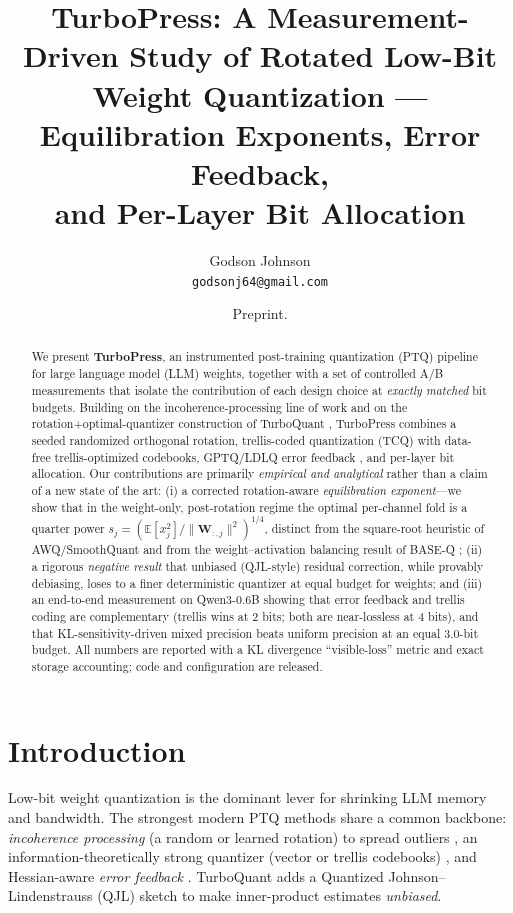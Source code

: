 \documentclass[11pt]{article}
\title{\textbf{TurboPress}: A Measurement-Driven Study of Rotated Low-Bit\\
Weight Quantization --- Equilibration Exponents, Error Feedback,\\
and Per-Layer Bit Allocation}
\author{Godson Johnson\\ \texttt{godsonj64@gmail.com}}
\date{Preprint.}
\newcommand{\E}{\mathbb{E}}
\newcommand{\W}{\mathbf{W}}
\begin{document}
\maketitle

\begin{abstract}
We present \textbf{TurboPress}, an instrumented post-training quantization (PTQ)
pipeline for large language model (LLM) weights, together with a set of
controlled A/B measurements that isolate the contribution of each design choice
at \emph{exactly matched} bit budgets. Building on the incoherence-processing
line of work \citep{chee2023quip,tseng2024quipsharp,tseng2024qtip,ashkboos2024quarot}
and on the rotation+optimal-quantizer construction of TurboQuant
\citep{zandieh2025turboquant}, TurboPress combines a seeded randomized
orthogonal rotation, trellis-coded quantization (TCQ) with data-free
trellis-optimized codebooks, GPTQ/LDLQ error feedback
\citep{frantar2023gptq,chee2023quip}, and per-layer bit allocation. Our
contributions are primarily \emph{empirical and analytical} rather than a claim
of a new state of the art: (i) a corrected rotation-aware \emph{equilibration
exponent}---we show that in the weight-only, post-rotation regime the optimal
per-channel fold is a quarter power $s_j=(\E[x_j^2]/\lVert \W_{:,j}\rVert^2)^{1/4}$,
distinct from the square-root heuristic of AWQ/SmoothQuant
\citep{lin2024awq,xiao2023smoothquant} and from the weight--activation balancing
result of BASE-Q \citep{he2025baseq}; (ii) a rigorous \emph{negative result} that
unbiased (QJL-style) residual correction, while provably debiasing, loses to a
finer deterministic quantizer at equal budget for weights; and (iii) an
end-to-end measurement on Qwen3-0.6B showing that error feedback and trellis
coding are complementary (trellis wins at 2 bits; both are near-lossless at 4
bits), and that KL-sensitivity-driven mixed precision beats uniform precision at
an equal $3.0$-bit budget. All numbers are reported with a KL divergence
``visible-loss'' metric and exact storage accounting; code and configuration are
released.
\end{abstract}

\section{Introduction}
Low-bit weight quantization is the dominant lever for shrinking LLM memory and
bandwidth. The strongest modern PTQ methods share a common backbone:
\emph{incoherence processing} (a random or learned rotation) to spread outliers
\citep{chee2023quip,ashkboos2024quarot,liu2024spinquant}, an
information-theoretically strong quantizer (vector or trellis codebooks)
\citep{tseng2024quipsharp,tseng2024qtip,vanderouderaa2024pvq}, and Hessian-aware
\emph{error feedback} \citep{frantar2022obc,frantar2023gptq}. TurboQuant
\citep{zandieh2025turboquant} adds a Quantized Johnson--Lindenstrauss (QJL)
sketch \citep{zandieh2024qjl} to make inner-product estimates \emph{unbiased}.
\end{document}
